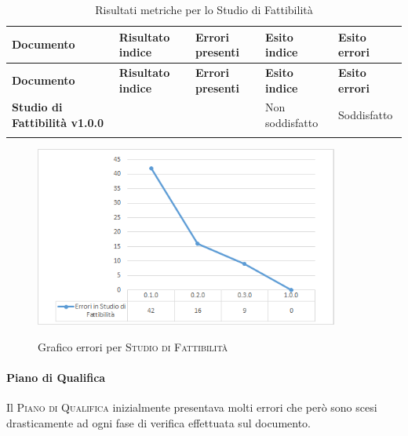 \documentclass[../piano-di-qualifica.tex]{subfiles}
\begin{document}
\renewcommand{\arraystretch}{2} %
\begin{longtable}[H]{>{\centering\bfseries}m{6cm} >{\centering}m{2cm} >{\centering}m{2.5cm} >{\centering}m{2.5cm} >{\centering\arraybackslash}m{2.5cm}}  
  \rowcolor{lightgray}
  {\textbf{Documento}} & {\textbf{Risultato indice}} & {\textbf{Errori presenti}} & {\textbf{Esito indice}} & {\textbf{Esito errori}}  \\
  \endfirsthead%
  \rowcolor{lightgray}
  {\textbf{Documento}} & {\textbf{Risultato indice}} & {\textbf{Errori presenti}} & {\textbf{Esito indice}} & {\textbf{Esito errori}}  \\
  \endhead%
  \textbf{Studio di Fattibilità v1.0.0} &                  & 0               & Non soddisfatto & Soddisfatto \\
  \caption{Risultati metriche per lo Studio di Fattibilità}
  \label{tab:my-table}
\end{longtable}

    \begin{figure}[H]
        \centering
        \includegraphics[width=10cm]{img/erroriStudio.png}
        \label{fig:scice_documenti}
        \caption{Grafico errori per \textsc{Studio di Fattibilità}}
    \end{figure}

\paragraph{Piano di Qualifica}
\label{sub:piano_di_qualifica}
Il \textsc{Piano di Qualifica} inizialmente presentava molti errori che però sono scesi drasticamente ad ogni fase di verifica effettuata sul documento.
\end{document}
